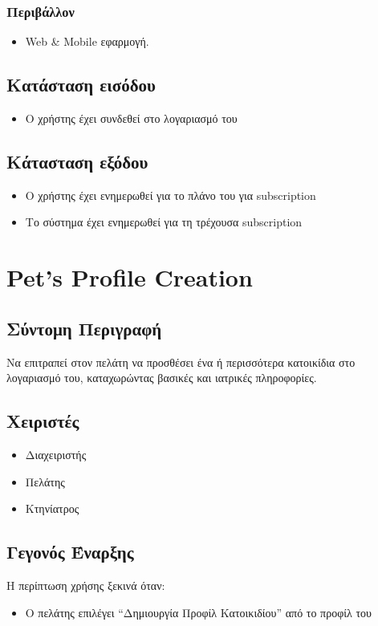 \documentclass[12pt,a4paper,twoside]{book}
\begin{document}
\subsubsection{Περιβάλλον}
\begin{itemize}
  \item Web \& Mobile εφαρμογή.
\end{itemize}

\subsection{Κατάσταση εισόδου} %
\begin{itemize}
  \item Ο χρήστης έχει συνδεθεί στο λογαριασμό του %
\end{itemize}

\subsection{Κάτασταση εξόδου} %
\begin{itemize}
  \item Ο χρήστης έχει ενημερωθεί για το πλάνο του για subscription
  \item Το σύστημα έχει ενημερωθεί για τη τρέχουσα subscription
\end{itemize}

\section{Pet's Profile Creation} %

\subsection{Σύντομη Περιγραφή}
Να επιτραπεί στον πελάτη να προσθέσει ένα ή περισσότερα κατοικίδια στο λογαριασμό του, καταχωρώντας βασικές και ιατρικές πληροφορίες. %

\subsection{Χειριστές}
\begin{itemize}
  \item Διαχειριστής
  \item Πελάτης
  \item Κτηνίατρος
\end{itemize}

\subsection{Γεγονός Έναρξης}
Η περίπτωση χρήσης ξεκινά όταν:
\begin{itemize}
  \item Ο πελάτης επιλέγει “Δημιουργία Προφίλ Κατοικιδίου” από το προφίλ του   %
\end{itemize}
\end{document}
